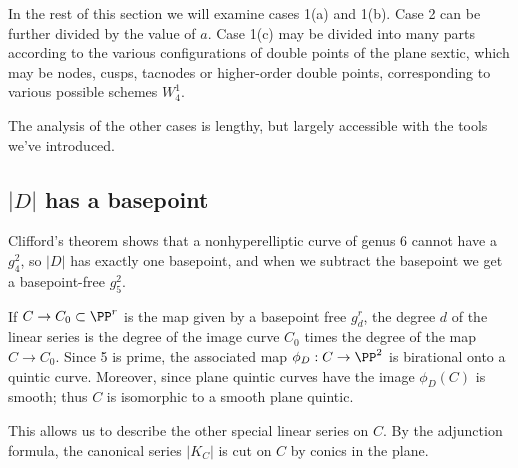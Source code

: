 In the rest of this section we will examine cases 1(a) and 1(b). Case 2 can
be further divided by the value of $a$.
Case 1(c) may be divided into many parts according to the various
configurations
of double points of the plane sextic, which may be nodes, cusps, tacnodes
or higher-order double points,  corresponding to various possible
schemes $W^{1}_{4}$.

The analysis of the other cases is lengthy, but largely accessible with
the tools we've introduced.


\subsection*{$|D|$ has a basepoint}

Clifford's theorem shows that a nonhyperelliptic curve of genus 6 cannot
have a $g^2_4$, so
$|D|$ has exactly one basepoint, and when we subtract the basepoint we
get a basepoint-free $g^2_5$.

If $C \to C_0 \subset \PP^r$ is the map given by a basepoint free $g^r_d$,
the degree $d$ of the linear series is the degree of the image curve $C_0$
times the degree of the map $C \to C_0$. Since 5 is prime, the associated
map $\phi_D : C \to \PP^2$ is birational onto a quintic curve. Moreover,
since 
%
plane quintic
 curves have 
%
the image $\phi_D(C)$
is smooth; thus $C$ is isomorphic to a smooth plane quintic.

This allows us to describe the other special linear series on $C$. By
the adjunction formula, the canonical series $|K_C|$ is cut on $C$
by conics in the plane.

